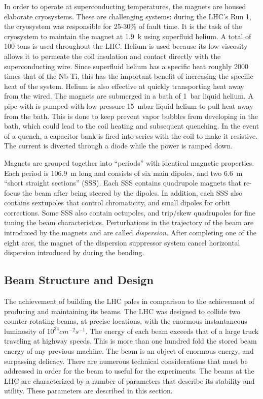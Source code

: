 In order to operate at superconducting temperatures, the magnets are housed elaborate cryosystems.
These are challenging systems: during the LHC's Run 1, the cryosystem was responsible for 25-30\% of fault time.\cite{lhcRun1}
It is the task of the cryosystem to maintain the magnet at 1.9~k using superfluid helium. A total of 100 tons is used throughout the LHC.
Helium is used because its low viscosity allows it to permeate the coil insulation and contact directly with the superconducting wire.
Since superfluid helium has a specific heat roughly 2000 times that of the Nb-Ti, this has the important benefit of increasing the specific heat of the system.
Helium is also effective at quickly transporting heat away from the wired.
The magnets are submerged in a bath of 1~bar liquid helium. A pipe with is pumped with low pressure 15~mbar liquid helium to pull heat away from the bath.
This is done to keep prevent vapor bubbles from developing in the bath, which could lead to the coil heating and subsequent quenching.
In the event of a quench, a capacitor bank is fired into series with the coil to make it resistive. The current is diverted through a diode while the power is ramped down.

Magnets are grouped together into ``periods'' with identical magnetic properties.
Each period is 106.9~m long and consists of six main dipoles, and two 6.6~m ``short straight sections'' (SSS).
Each SSS contains quadrupole magnets that re-focus the beam after being steered by the dipoles.
In addition, each SSS also contains sextupoles that control chromaticity, and small dipoles for orbit corrections.
Some SSS also contain octupoles, and trip/skew quadrupoles for fine tuning the beam characteristics.
Perturbations in the trajectory of the beam are introduced by the magnets and are called \emph{dispersion}.
After completing one of the eight arcs, the magnet of the dispersion suppressor system cancel horizontal dispersion introduced by during the bending.

\subsection{Beam Structure and Design}
The achievement of building the LHC pales in comparison to the achievement of producing and maintaining its beams.
The LHC was designed to collide two counter-rotating beams, at precise locations, with the enormous instantaneous luminosity of $10^{34}cm^{-2}s^{-1}$.
The energy of each beam exceeds that of a large truck traveling at highway speeds.
This is more than one hundred fold the stored beam energy of any previous machine. \cite{lyndon}
The beam is an object of enormous energy, and surpassing delicacy.
There are numerous technical considerations that must be addressed in order for the beam to useful for the experiments.
The beams at the LHC are characterized by a number of parameters that describe its stability and utility.
These parameters are described in this section.

